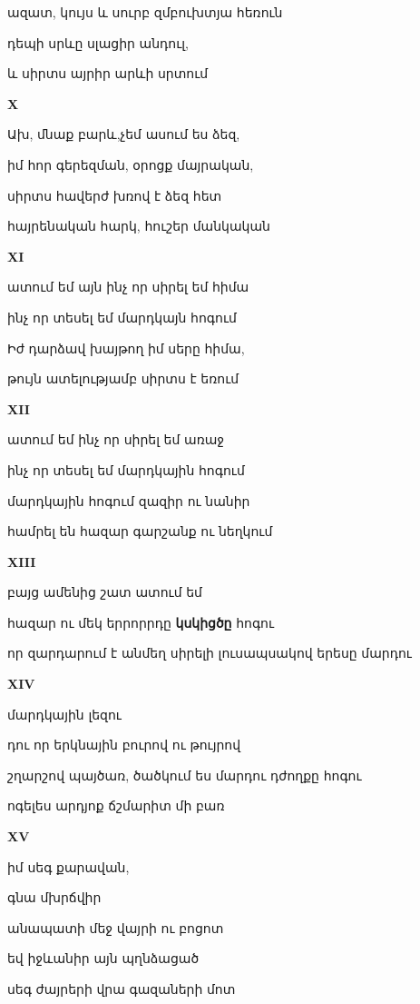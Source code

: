 ազատ,  կույս  և սուրբ զմբուխտյա հեռուն


դեպի սրևը սլացիր անդուլ,


և սիրտս այրիր արևի սրտում


            
\centerline {\bf X }


Ախ, մնաք բարև,չեմ ասում ես ձեզ, 


իմ հոր գերեզման, օրոցք մայրական,


 սիրտս  հավերժ խռով է ձեզ հետ


հայրենական հարկ,  հուշեր մանկական


\centerline {\bf  XI}

ատում եմ այն ինչ որ սիրել եմ հիմա


ինչ որ տեսել եմ  մարդկայն հոգում


Իժ դարձավ խայթող իմ սերը հիմա,

  թույն ատելությամբ  սիրտս է եռում

\centerline{\bf XII}

ատում եմ ինչ որ սիրել եմ առաջ


ինչ որ տեսել եմ մարդկային հոգում

մարդկային հոգում զազիր ու նանիր 


համրել են հազար գարշանք ու նեղկում  

            \centerline{\bf  XIII  }



բայց ամենից շատ ատում եմ 


հազար ու մեկ երրորրդը {\bf կսկիցծը } հոգու


որ զարդարում է անմեղ սիրելի լուսապսակով  երեսը մարդու




\centerline{\bf XIV}

մարդկային լեզու



դու  որ երկնային բուրով ու թույրով


շղարշով պայծառ,  ծածկում ես մարդու դժողքը հոգու



ոգելես արդյոք ճշմարիտ մի բառ



\centerline {\bf XV}



իմ սեգ քարավան,


գնա մխրճվիր 

անապատի մեջ վայրի ու բոցոտ


եվ  իջևանիր այն պղնձացած 


սեգ ժայրերի վրա գազաների մոտ


